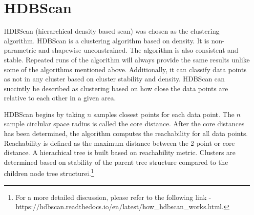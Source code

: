 \documentclass{article}
\begin{document}
\section{HDBScan}
HDBScan (hierarchical density based scan) was chosen as the clustering algorithm. HDBScan is a clustering algorithm based on density. It is non-parametric and shapewise unconstrained. The algorithm is also consistent and stable. Repeated runs of the algorithm will always provide the same results unlike some of the algorithms mentioned above. Additionally, it can classify data points as not in any cluster based on cluster stability and density.  HDBScan can succintly be described as clustering based on how close the data points are relative to each other in a given area.


HDBScan begins by taking $n$ samples closest points for each data point. The $n$ sample circlular space radius is called the core distance. After the core distances has been determined, the algorithm computes the reachability for all data points. Reachability is defined as the maximum distance between the 2 point or core distance. A hierachical tree is built based on reachability metric. Clusters are determined based on stability of the parent tree structure compared to the children node tree structurei.\footnote{For a more detailed discussion, please refer to the following link -  https://hdbscan.readthedocs.io/en/latest/how\_hdbscan\_works.html.}
\end{document}
